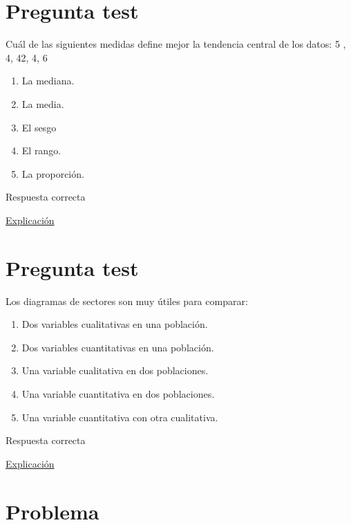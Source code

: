 \documentclass[
]{book}
\providecommand{\tightlist}{%
  \setlength{\itemsep}{0pt}\setlength{\parskip}{0pt}}
\begin{document}
\hypertarget{pregunta-test-50}{%
\section{Pregunta test}\label{pregunta-test-50}}

Cuál de las siguientes medidas define mejor la tendencia central de los datos: 5 , 4, 42, 4, 6

\begin{enumerate}
\def\labelenumi{\alph{enumi})}
\tightlist
\item
  La mediana.
\item
  La media.
\item
  El sesgo
\item
  El rango.
\item
  La proporción.
\end{enumerate}

Respuesta correcta

\href{https://1fjmanzano.github.io/bioestadistica/medidas-de-posicio\%CC\%81n-dispersio\%CC\%81n-y-forma.html\#medidas-de-posicio\%CC\%81n-centrales}{Explicación}

\hypertarget{pregunta-test-51}{%
\section{Pregunta test}\label{pregunta-test-51}}

Los diagramas de sectores son muy útiles para comparar:

\begin{enumerate}
\def\labelenumi{\alph{enumi})}
\tightlist
\item
  Dos variables cualitativas en una población.
\item
  Dos variables cuantitativas en una población.
\item
  Una variable cualitativa en dos poblaciones.
\item
  Una variable cuantitativa en dos poblaciones.
\item
  Una variable cuantitativa con otra cualitativa.
\end{enumerate}

Respuesta correcta

\href{https://1fjmanzano.github.io/bioestadistica/diagramas-de-barras-y-sectores.html}{Explicación}

\hypertarget{problema-7}{%
\section{Problema}\label{problema-7}}
\end{document}
